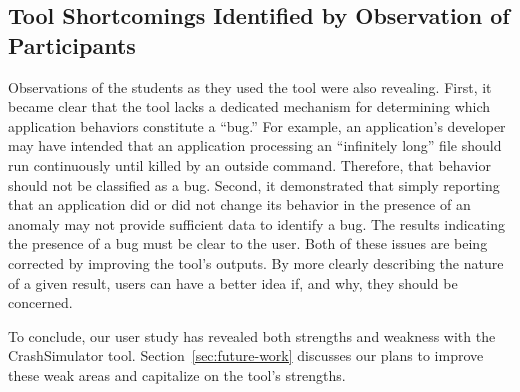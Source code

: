 \subsection{Tool Shortcomings Identified by Observation of Participants}
\label{subsec:tool-shortcomings}
Observations of the students as they used the tool were also revealing.
First,
it became clear that the tool
lacks a dedicated mechanism
for determining
which application behaviors constitute a ``bug.''
For example, an application's developer
may have intended that an application processing an ``infinitely long'' file should run continuously
until killed by an outside command.
Therefore, that behavior should not be classified as a bug.
Second,
it demonstrated that
simply reporting that an application did or did not change its behavior
in the presence of an anomaly may not provide sufficient data to identify a bug. The results indicating the presence of a bug must be clear to the user.
Both of these issues are being corrected
by improving the tool's outputs.
By more clearly describing
the nature of a given result,
users can have a better idea
if,
and why,
they should be concerned.

To conclude, our user study has revealed both strengths and weakness
with the CrashSimulator tool.  Section~\ref{sec:future-work}
discusses our plans to improve
these weak areas and capitalize on the tool's strengths.
